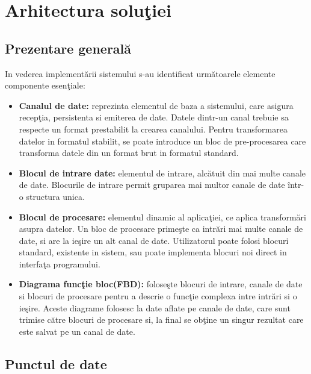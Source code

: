 \chapter{Arhitectura soluţiei}

\section{Prezentare generală}

In vederea implementării sistemului s-au identificat următoarele elemente componente esenţiale: 
\begin{itemize}
\item \textbf{Canalul de date:} reprezinta elementul de baza a sistemului, care asigura recepţia, persistenta si emiterea de date. Datele dintr-un canal trebuie sa respecte un format prestabilit la crearea canalului. Pentru transformarea datelor in formatul stabilit, se poate introduce un bloc de pre-procesarea care transforma datele din un format brut in formatul standard.
\item \textbf{Blocul de intrare date:} elementul de intrare, alcătuit din mai multe canale de date. Blocurile de intrare permit gruparea mai multor canale de date într-o structura unica.   
\item \textbf{Blocul de procesare:} elementul dinamic al aplicaţiei, ce aplica transformări asupra datelor. Un bloc de procesare primeşte ca intrări mai multe canale de date, si are la ieşire un alt canal de date. Utilizatorul poate folosi blocuri standard, existente in sistem, sau poate implementa blocuri noi direct in interfaţa programului.
\item \textbf{Diagrama funcţie bloc(FBD):}  foloseşte blocuri de intrare, canale de date si blocuri de procesare pentru a descrie o funcţie complexa intre intrări si o ieşire. Aceste diagrame folosesc la date aflate pe canale de date, care sunt trimise către blocuri de procesare si, la final se obţine un singur rezultat care este salvat pe un canal de date.
\end{itemize}

\section{Punctul de date}

